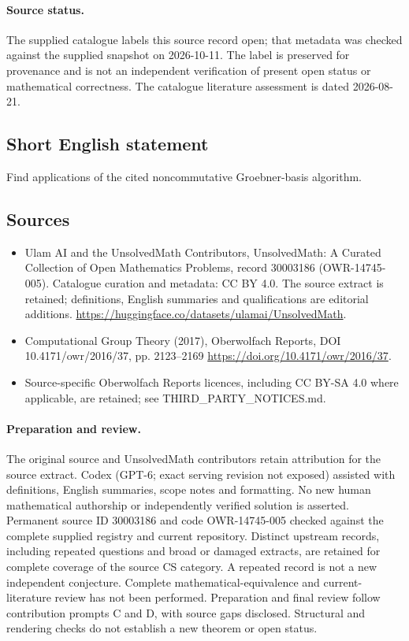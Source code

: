 \documentclass[11pt]{article}
\begin{document}
\paragraph{Source status.}
The supplied catalogue labels this source record open; that metadata was checked against the supplied snapshot on 2026-10-11. The label is preserved for provenance and is not an independent verification of present open status or mathematical correctness. The catalogue literature assessment is dated 2026-08-21.
\subsection{Short English statement}
Find applications of the cited noncommutative Groebner-basis algorithm.
\subsection{Sources}
\begin{itemize}
\item[S1] Ulam AI and the UnsolvedMath Contributors, UnsolvedMath: A Curated Collection of Open Mathematics Problems, record 30003186 (OWR-14745-005). Catalogue curation and metadata: CC BY 4.0. The source extract is retained; definitions, English summaries and qualifications are editorial additions.
\url{https://huggingface.co/datasets/ulamai/UnsolvedMath}.
\item[S2] Computational Group Theory (2017), Oberwolfach Reports, DOI 10.4171/owr/2016/37, pp. 2123--2169
\url{https://doi.org/10.4171/owr/2016/37}.
\item Source-specific Oberwolfach Reports licences, including CC BY-SA 4.0 where applicable, are retained; see THIRD\_PARTY\_NOTICES.md.
\end{itemize}
\paragraph{Preparation and review.}
The original source and UnsolvedMath contributors retain attribution for the source extract. Codex (GPT-6; exact serving revision not exposed) assisted with definitions, English summaries, scope notes and formatting. No new human mathematical authorship or independently verified solution is asserted. Permanent source ID 30003186 and code OWR-14745-005 checked against the complete supplied registry and current repository. Distinct upstream records, including repeated questions and broad or damaged extracts, are retained for complete coverage of the source CS category. A repeated record is not a new independent conjecture. Complete mathematical-equivalence and current-literature review has not been performed. Preparation and final review follow contribution prompts C and D, with source gaps disclosed. Structural and rendering checks do not establish a new theorem or open status.
\label{end:30003186}
\end{document}
